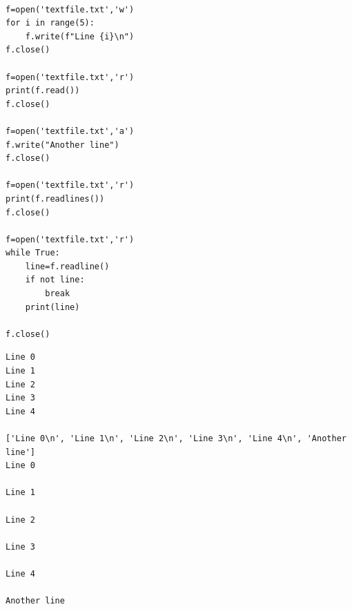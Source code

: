 \begin{verbatim}
    
f=open('textfile.txt','w')
for i in range(5):
    f.write(f"Line {i}\n")
f.close()

f=open('textfile.txt','r')
print(f.read())
f.close()

f=open('textfile.txt','a')
f.write("Another line")
f.close()

f=open('textfile.txt','r')
print(f.readlines())
f.close()

f=open('textfile.txt','r')
while True:
    line=f.readline()
    if not line:
        break
    print(line)

f.close()
\end{verbatim}

\begin{verbatim}
Line 0
Line 1
Line 2
Line 3
Line 4

['Line 0\n', 'Line 1\n', 'Line 2\n', 'Line 3\n', 'Line 4\n', 'Another line']
Line 0

Line 1

Line 2

Line 3

Line 4

Another line
\end{verbatim}

